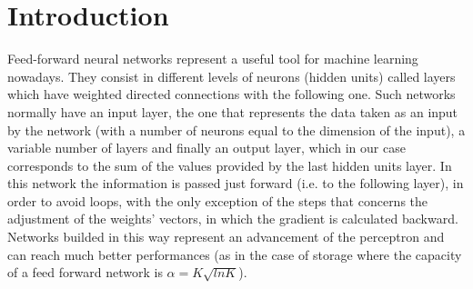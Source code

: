 \section{Introduction}
\label{sec:introduction}

Feed-forward neural networks represent a useful tool for machine learning nowadays. They consist in different levels of
neurons (hidden units) called layers which have weighted directed connections with the following one. Such networks normally have an
input layer, the one that represents the data taken as an input by the network (with a number of neurons equal to the dimension
of the input), a variable number of layers and finally an output layer, which in our case corresponds to the sum of the values
provided by the last hidden units layer. In this network the information is passed just forward (i.e. to the following layer), in order
to avoid loops, with the only exception of the steps that concerns the adjustment of the weights' vectors, in which the gradient is calculated backward.
Networks builded in this way represent an advancement of the perceptron and can reach much better performances (as in the case of storage where the capacity
of a feed forward network is $\alpha = K \sqrt{ln K}$).